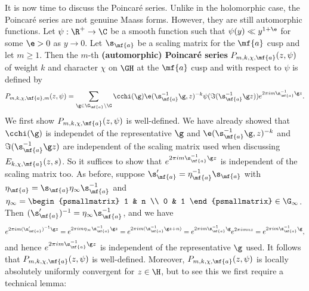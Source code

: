     It is now time to discuss the Poincar\'e series. Unlike in the holomorphic case, the Poincar\'e series are not genuine Maass forms. However, they are still automorphic functions. Let $\psi:\R^{+} \to \C$ be a smooth function such that $\psi(y) \ll y^{1+\e}$ for some $\e > 0$ as $y \to 0$. Let $\s_{\mf{a}}$ be a scaling matrix for the $\mf{a}$ cusp and let $m \ge 1$. Then the $m$-th \textbf{(automorphic) Poincar\'e series} $P_{m,k,\chi,\mf{a}}(z,\psi)$ of weight $k$ and character $\chi$ on $\GH$ at the $\mf{a}$ cusp and with respect to $\psi$ is defined by
    \[
      P_{m,k,\chi,\mf{a},m}(z,\psi) = \sum_{\g \in \G_{\mf{a}}\backslash\G}\cchi(\g)\e(\s_{\mf{a}}^{-1}\g,z)^{-k}\psi(\Im(\s_{\mf{a}}^{-1}\g z))e^{2\pi im\s_{\mf{a}}^{-1}\g z}.
    \]
    We first show $P_{m,k,\chi,\mf{a}}(z,\psi)$ is well-defined. We have already showed that $\cchi(\g)$ is independet of the representative $\g$ and $\e(\s_{\mf{a}}^{-1}\g,z)^{-k}$ and $\Im(\s_{\mf{a}}^{-1}\g z)$ are independent of the scaling matrix used when discussing $E_{k,\chi,\mf{a}}(z,s)$. So it suffices to show that $e^{2\pi im\s_{\mf{a}}^{-1}\g z}$ is independent of the scaling matrix too. As before, suppose $\s_{\mf{a}}' = \eta_{\mf{a}}^{-1}\s_{\mf{a}}$ with $\eta_{\mf{a}} = \s_{\mf{a}}\eta_{\infty}\s_{\mf{a}}^{-1}$ and $\eta_{\infty} = \begin{psmallmatrix} 1 & n \\ 0 & 1 \end{psmallmatrix} \in \G_{\infty}$. Then $(\s_{\mf{a}}')^{-1} = \eta_{\infty}\s_{\mf{a}}^{-1}$, and we have
    \[
      e^{2\pi im(\s_{\mf{a}}')^{-1}\g z} = e^{2\pi im\eta_{\infty}\s_{\mf{a}}^{-1}\g z} = e^{2\pi im(\s_{\mf{a}}^{-1}\g z+n)} = e^{2\pi im\s_{\mf{a}}^{-1}\g}e^{2\pi imnz} = e^{2\pi im\s_{\mf{a}}^{-1}\g},
    \]
    and hence $e^{2\pi im\s_{\mf{a}}^{-1}\g z}$ is independent of the representative $\g$ used. It follows that $P_{m,k,\chi,\mf{a}}(z,\psi)$ is well-defined. Moreover, $P_{m,k,\chi,\mf{a}}(z,\psi)$ is locally absolutely uniformly convergent for $z \in \H$, but to see this we first require a technical lemma:

